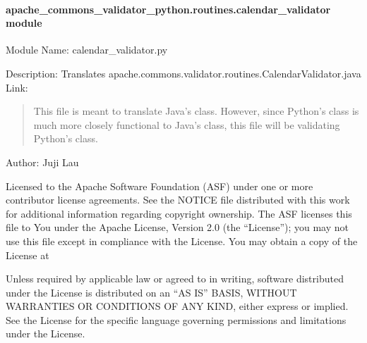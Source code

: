 \documentclass[letterpaper,10pt,english]{sphinxmanual}
\begin{document}
\paragraph{apache\_commons\_validator\_python.routines.calendar\_validator module}
\label{\detokenize{apache_commons_validator_python.routines:module-apache_commons_validator_python.routines.calendar_validator}}\label{\detokenize{apache_commons_validator_python.routines:apache-commons-validator-python-routines-calendar-validator-module}}
\sphinxAtStartPar
Module Name: calendar\_validator.py

\sphinxAtStartPar
Description: Translates apache.commons.validator.routines.CalendarValidator.java
Link: 
\begin{quote}

\sphinxAtStartPar
This file is meant to translate Java’s  class.  However, since Python’s
 class is much more closely functional to Java’s  class, this
file will be validating Python’s  class.
\end{quote}

\sphinxAtStartPar
Author: Juji Lau
\begin{description}
\sphinxAtStartPar
Licensed to the Apache Software Foundation (ASF) under one or more
contributor license agreements. See the NOTICE file distributed with
this work for additional information regarding copyright ownership.
The ASF licenses this file to You under the Apache License, Version 2.0
(the “License”); you may not use this file except in compliance with
the License. You may obtain a copy of the License at
\begin{quote}

\sphinxAtStartPar
{}
\end{quote}

\sphinxAtStartPar
Unless required by applicable law or agreed to in writing, software
distributed under the License is distributed on an “AS IS” BASIS,
WITHOUT WARRANTIES OR CONDITIONS OF ANY KIND, either express or implied.
See the License for the specific language governing permissions and
limitations under the License.

\end{description}
\end{document}
